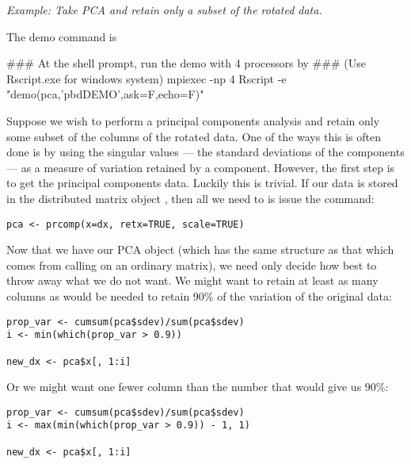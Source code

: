 \emph{Example:  Take PCA and retain only a subset of the rotated data.}

The demo command is
\begin{Command}
### At the shell prompt, run the demo with 4 processors by
### (Use Rscript.exe for windows system)
mpiexec -np 4 Rscript -e "demo(pca,'pbdDEMO',ask=F,echo=F)"
\end{Command}

Suppose we wish to perform a principal components analysis and retain only some subset of the columns of the rotated data.  One of the ways this is often done is by using the singular values --- the standard deviations of the components --- as a measure of variation retained by a component.  However, the first step is to get the principal components data.  Luckily this is trivial.  If our data is stored in the distributed matrix object , then all we need to is issue the command:
\begin{lstlisting}[language=rr]
pca <- prcomp(x=dx, retx=TRUE, scale=TRUE)
\end{lstlisting}

Now that we have our PCA object (which has the same structure as that which comes from calling  on an ordinary  matrix), we need only decide how best to throw away what we do not want.  We might want to retain at least as many columns as would be needed to retain 90\% of the variation of the original data:

\begin{lstlisting}[language=rr]
prop_var <- cumsum(pca$sdev)/sum(pca$sdev)
i <- min(which(prop_var > 0.9))

new_dx <- pca$x[, 1:i]
\end{lstlisting}

Or we might want one fewer column than the number that would give us 90\%:

\begin{lstlisting}[language=rr]
prop_var <- cumsum(pca$sdev)/sum(pca$sdev)
i <- max(min(which(prop_var > 0.9)) - 1, 1)

new_dx <- pca$x[, 1:i]
\end{lstlisting}


